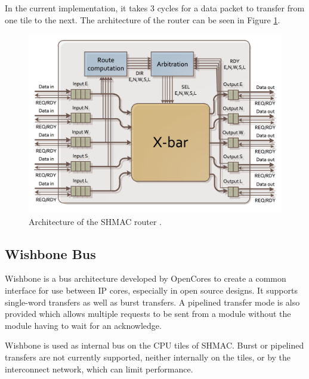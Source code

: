 In the current implementation, it takes 3 cycles for a data packet to transfer from one tile to the next. 
The architecture of the router can be seen in Figure \ref{fig:shmac-router}.

\begin{figure}[htb]
    \centering
    \includegraphics[width=1.0\textwidth]{Figures/Heterogeneous/SHMACRouter}
    \caption{Architecture of the SHMAC router \cite{shmac-plan}.}
    \label{fig:shmac-router}
\end{figure}

\subsection{Wishbone Bus}

Wishbone is a bus architecture developed by OpenCores to create a common interface for use between IP cores, especially in
open source designs. It supports single-word transfers as well as burst transfers. A pipelined transfer mode is also provided
which allows multiple requests to be sent from a module without the module having to wait for an acknowledge.

Wishbone is used as internal bus on the CPU tiles of SHMAC. Burst or pipelined transfers are
not currently supported, neither internally on the tiles, or by the interconnect network, which can limit performance.



